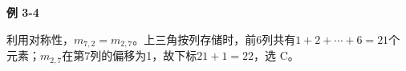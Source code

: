 {\color{ink}\bfseries 例 3-4}\par\vspace{1bp}利用对称性，\(m_{7,\allowbreak{}2}=\allowbreak{}m_{2,\allowbreak{}7}\)。上三角按列存储时，前6列共有\(1+\allowbreak{}2+\allowbreak{}\cdots +\allowbreak{}6=\allowbreak{}21\)个元素；\(m_{2,\allowbreak{}7}\)在第7列的偏移为1，故下标\(21+\allowbreak{}1=\allowbreak{}22\)，选 C。
